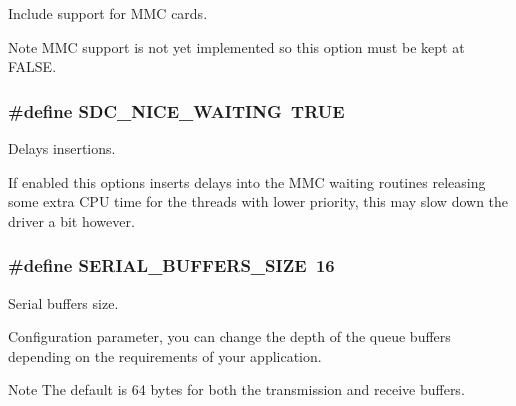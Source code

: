 Include support for M\+M\+C cards. 

\begin{DoxyNote}{Note}
M\+M\+C support is not yet implemented so this option must be kept at {\ttfamily F\+A\+L\+S\+E}. 
\end{DoxyNote}
\hypertarget{group___h_a_l___c_o_n_f_ga3391c832c171a8606b0fc864766f08ba}{}
\subsubsection[{S\+D\+C\+\_\+\+N\+I\+C\+E\+\_\+\+W\+A\+I\+T\+I\+N\+G}]{\setlength{\rightskip}{0pt plus 5cm}\#define S\+D\+C\+\_\+\+N\+I\+C\+E\+\_\+\+W\+A\+I\+T\+I\+N\+G~T\+R\+U\+E}\label{group___h_a_l___c_o_n_f_ga3391c832c171a8606b0fc864766f08ba}


Delays insertions. 

If enabled this options inserts delays into the M\+M\+C waiting routines releasing some extra C\+P\+U time for the threads with lower priority, this may slow down the driver a bit however. \hypertarget{group___h_a_l___c_o_n_f_ga81a9fb00c7a1ce0fe70f263d8fd820e8}{}
\subsubsection[{S\+E\+R\+I\+A\+L\+\_\+\+B\+U\+F\+F\+E\+R\+S\+\_\+\+S\+I\+Z\+E}]{\setlength{\rightskip}{0pt plus 5cm}\#define S\+E\+R\+I\+A\+L\+\_\+\+B\+U\+F\+F\+E\+R\+S\+\_\+\+S\+I\+Z\+E~16}\label{group___h_a_l___c_o_n_f_ga81a9fb00c7a1ce0fe70f263d8fd820e8}


Serial buffers size. 

Configuration parameter, you can change the depth of the queue buffers depending on the requirements of your application. \begin{DoxyNote}{Note}
The default is 64 bytes for both the transmission and receive buffers. 
\end{DoxyNote}
\hypertarget{group___h_a_l___c_o_n_f_gacb4c08ac23f83ac9d58c50ff840de516}{}
